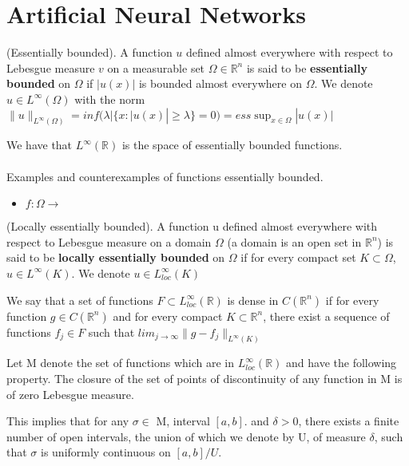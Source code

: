 \documentclass[../main.tex]{subfiles}
\begin{document}
\chapter{Artificial Neural Networks} \label{ch:methods}




\begin{definition} (Essentially bounded).
	A function $u$ defined almost everywhere with respect to Lebesgue measure $v$ on a measurable set $\Omega \in \mathbb{R}^n$ is said to be \textbf{essentially bounded} on $\Omega$ if $|u(x)|$ is bounded almost everywhere on $\Omega$. We denote $u\in L^{\infty}(\Omega)$ with the norm $\|u\|_{L^{\infty}(\Omega)}= inf(\lambda | \{ x : |u(x)| \geq \lambda \} = 0 ) = ess \sup_{x\in \Omega} |u(x)|$ 
\end{definition}

We have that $L^{\infty}(\mathbb{R})$ is the space of essentially bounded functions.
\\ \\ 
Examples and counterexamples of functions essentially bounded. 
\begin{itemize}
\item $f:\Omega \rightarrow $
\end{itemize}

\begin{definition} (Locally essentially bounded).
	A function u defined almost everywhere with respect to Lebesgue measure on a domain $\Omega$ (a domain is an open set in $\mathbb{R}^n$) is said to be\textbf{ locally essentially bounded }on $\Omega$ if for every compact set $K\subset \Omega$, $u\in L^{\infty}(K)$. We denote $u\in L_{loc}^{\infty}(K)$
\end{definition}

\begin{definition}We say that a set of functions $F\subset L_{loc}^{\infty}(\mathbb{R})$ is dense in $C(\mathbb{R}^n)$ if for every function $g\in C(\mathbb{R}^n)$ and for every compact $K\subset \mathbb{R}^n$, there exist a sequence of functions $f_j\in F$ such that $lim_{j\rightarrow\infty} \|g-f_j\|_{L^\infty(K)}$ 
\end{definition}

\begin{definition} Let M denote the set of functions which are in $L_{loc}^{\infty}(\mathbb{R})$ and have the following property. The closure of the set of points of discontinuity of any function in M is of zero Lebesgue measure. 
\begin{proposition}
This implies that for any $\sigma \in$ M, interval $[a,b] .$ and $\delta >0$, there exists a finite number of open intervals, the union of which we denote by U, of measure $\delta$, such that $\sigma$ is uniformly continuous on $[a,b]/U$. 
\end{proposition}
\end{definition}
\end{document}
